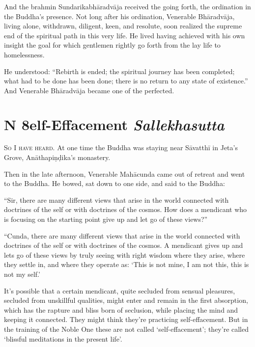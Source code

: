 \documentclass[12pt,openany]{book}%
\newcommand*{\suttatitleacronym}[1]{\smaller[2]{#1}\vspace*{.3em}}
\newcommand*{\suttatitletranslation}[1]{\linebreak{#1}}
\newcommand*{\suttatitleroot}[1]{\linebreak\smaller[2]\itshape{#1}}
\newcommand*{\tocacronym}[1]{\hspace*{-3.3em}{#1}\quad}
\newcommand*{\toctranslation}[1]{#1}
\newcommand*{\tocroot}[1]{(\textit{#1})}
\newcommand*{\scevam}[1]{\textsc{#1}}
\begin{document}
And the brahmin \textsanskrit{Sundarikabhāradvāja} received the going forth, the ordination in the Buddha’s presence. Not long after his ordination, Venerable \textsanskrit{Bhāradvāja}, living alone, withdrawn, diligent, keen, and resolute, soon realized the supreme end of the spiritual path in this very life. He lived having achieved with his own insight the goal for which gentlemen rightly go forth from the lay life to homelessness. 

He understood: “Rebirth is ended; the spiritual journey has been completed; what had to be done has been done; there is no return to any state of existence.” And Venerable \textsanskrit{Bhāradvāja} became one of the perfected. 

%
\section*{{\suttatitleacronym MN 8}{\suttatitletranslation Self-Effacement }{\suttatitleroot Sallekhasutta}}
\addcontentsline{toc}{section}{\tocacronym{MN 8} \toctranslation{Self-Effacement } \tocroot{Sallekhasutta}}

\scevam{So I have heard. }At one time the Buddha was staying near \textsanskrit{Sāvatthī} in Jeta’s Grove, \textsanskrit{Anāthapiṇḍika}’s monastery. 

Then in the late afternoon, Venerable \textsanskrit{Mahācunda} came out of retreat and went to the Buddha. He bowed, sat down to one side, and said to the Buddha: 

“Sir, there are many different views that arise in the world connected with doctrines of the self or with doctrines of the cosmos. How does a mendicant who is focusing on the starting point give up and let go of these views?” 

“Cunda, there are many different views that arise in the world connected with doctrines of the self or with doctrines of the cosmos. A mendicant gives up and lets go of these views by truly seeing with right wisdom where they arise, where they settle in, and where they operate as: ‘This is not mine, I am not this, this is not my self.’ 

It’s possible that a certain mendicant, quite secluded from sensual pleasures, secluded from unskillful qualities, might enter and remain in the first absorption, which has the rapture and bliss born of seclusion, while placing the mind and keeping it connected. They might think they’re practicing self-effacement. But in the training of the Noble One these are not called ‘self-effacement’; they’re called ‘blissful meditations in the present life’. 
\end{document}
